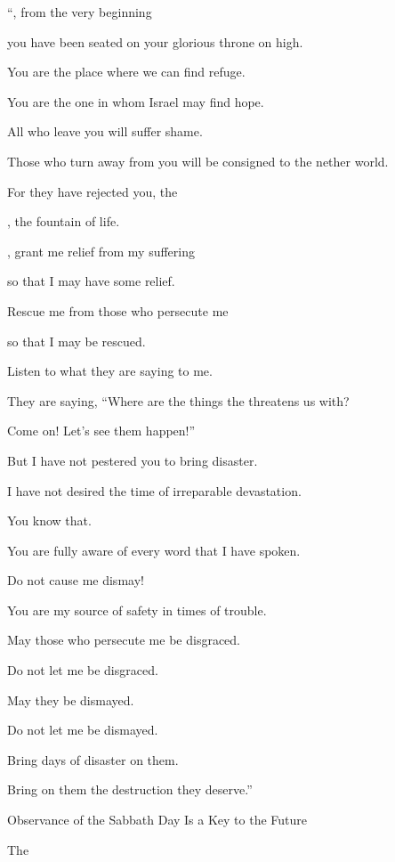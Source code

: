 {\par }{\Q “{}, from the very beginning
\par }{\Q you have been seated on your glorious
throne
on high.
\par }{\Q You are the place
where we can find refuge.
\par }{\Q {}You are the one in whom Israel
may find hope.
\par }{\Q All
who leave
you will suffer shame.
\par }{\Q Those who turn away
from you will be consigned
to the nether world.
\par }{\Q For
they have rejected
you, the

{}, the fountain
of life.
\par }{\Q {}, grant me relief
from my suffering
\par }{\Q so that
I may have some relief.
\par }{\Q Rescue
me from those who persecute me
\par }{\Q so that I may be rescued.
\par }{\Q {}Listen
to what
they
are saying
to me.
\par }{\Q They are saying, “Where
are the things
the {}
threatens us with?
\par }{\Q Come on! Let’s see them happen!”
\par }{\Q {}But I
have not
pestered
you to bring
disaster.
\par }{\Q I have not
desired
the time
of irreparable devastation.
\par }{\Q You
know
that.
\par }{\Q You are fully aware of every word
that I have spoken.
\par }{\Q {}Do not
cause
me dismay!

\par }{\Q You are my source of safety in times
of trouble.
\par }{\Q {}May those who persecute
me be disgraced.
\par }{\Q Do not
let me
be disgraced.
\par }{\Q May they
be dismayed.
\par }{\Q Do not
let me
be dismayed.
\par }{\Q Bring
days
of disaster
on them.
\par }{\Q Bring on them the destruction they deserve.”
\par }{\SH Observance of the Sabbath Day Is a Key to the Future
\par }{\PP {}The

}
